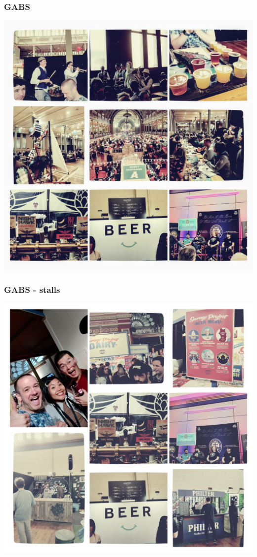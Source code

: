 \documentclass[12pt]{beamer}
\begin{document}
    \begin{frame}
        \frametitle{GABS}
        \includegraphics[height=0.80\textheight,width=1\textwidth]{img/gabs.jpg}
    \end{frame}

    \begin{frame}
        \frametitle{GABS - stalls}
        \includegraphics[height=0.80\textheight,width=1\textwidth]{img/gabs-stalls.jpg}
    \end{frame}
\end{document}
